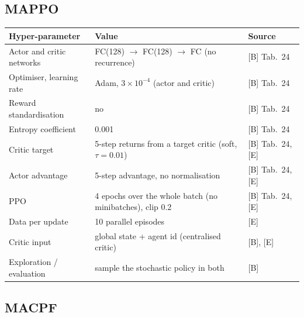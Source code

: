 \subsection{MAPPO}

\begin{table}[H]
\centering\small
\begin{tabularx}{\textwidth}{l X l}
\toprule
Hyper-parameter & Value & Source \\
\midrule
Actor and critic networks & FC(128) $\to$ FC(128) $\to$ FC (no recurrence) & [B] Tab.~24 \\
Optimiser, learning rate & Adam, $3\times10^{-4}$ (actor and critic) & [B] Tab.~24 \\
Reward standardisation & no & [B] Tab.~24 \\
Entropy coefficient & 0.001 & [B] Tab.~24 \\
Critic target & 5-step returns from a target critic (soft, $\tau=0.01$) & [B] Tab.~24, [E] \\
Actor advantage & 5-step advantage, no normalisation & [B] Tab.~24, [E] \\
PPO & 4 epochs over the whole batch (no minibatches), clip 0.2 & [B] Tab.~24, [E] \\
Data per update & 10 parallel episodes & [E] \\
Critic input & global state + agent id (centralised critic) & [B], [E] \\
Exploration / evaluation & sample the stochastic policy in both & [B] \\
\bottomrule
\end{tabularx}
\end{table}

\subsection{MACPF}

